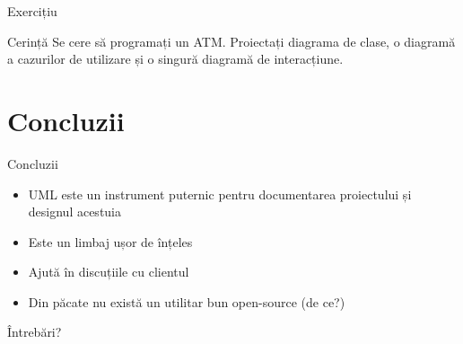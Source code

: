 \documentclass{beamer}
\begin{document}
\begin{frame}{Exercițiu}
  \begin{exampleblock}{Cerință}
    Se cere să programați un ATM. Proiectați diagrama de clase, o diagramă a
    cazurilor de utilizare și o singură diagramă de interacțiune.
  \end{exampleblock}
\end{frame}

\section {Concluzii}

\begin{frame}{Concluzii}
  \begin{itemize}[<+->]
    \item UML este un instrument puternic pentru documentarea proiectului și
    designul acestuia
    \item Este un limbaj ușor de înțeles
    \item Ajută în discuțiile cu clientul
    \item Din păcate nu există un utilitar bun open-source (de ce?)
  \end{itemize}
\end{frame}

\begin{frame}{Întrebări?}
\end{frame}
\end{document}
